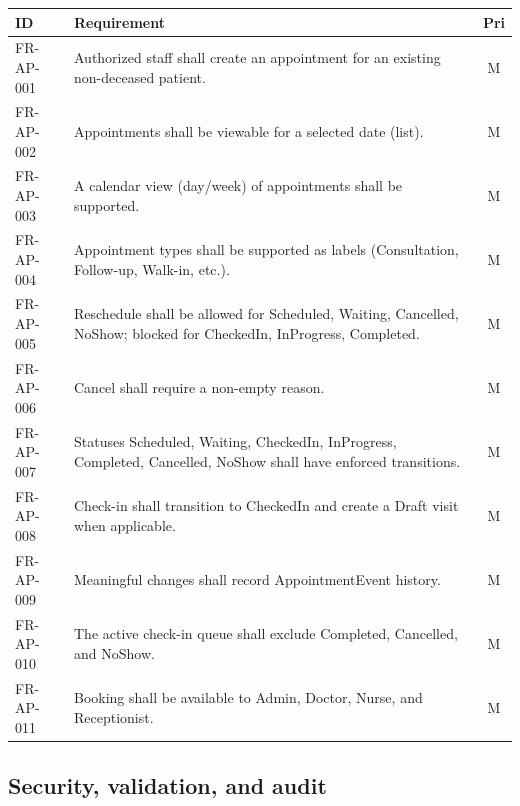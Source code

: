 \documentclass[11pt,a4paper]{article}
\begin{document}
\begin{longtable}{@{}p{2.2cm}p{11.2cm}c@{}}
\toprule
\textbf{ID} & \textbf{Requirement} & \textbf{Pri} \\
\midrule
\endhead
FR-AP-001 & Authorized staff shall create an appointment for an existing non-deceased patient. & M \\
FR-AP-002 & Appointments shall be viewable for a selected date (list). & M \\
FR-AP-003 & A calendar view (day/week) of appointments shall be supported. & M \\
FR-AP-004 & Appointment types shall be supported as labels (Consultation, Follow-up, Walk-in, etc.). & M \\
FR-AP-005 & Reschedule shall be allowed for Scheduled, Waiting, Cancelled, NoShow; blocked for CheckedIn, InProgress, Completed. & M \\
FR-AP-006 & Cancel shall require a non-empty reason. & M \\
FR-AP-007 & Statuses Scheduled, Waiting, CheckedIn, InProgress, Completed, Cancelled, NoShow shall have enforced transitions. & M \\
FR-AP-008 & Check-in shall transition to CheckedIn and create a Draft visit when applicable. & M \\
FR-AP-009 & Meaningful changes shall record AppointmentEvent history. & M \\
FR-AP-010 & The active check-in queue shall exclude Completed, Cancelled, and NoShow. & M \\
FR-AP-011 & Booking shall be available to Admin, Doctor, Nurse, and Receptionist. & M \\
\bottomrule
\end{longtable}

\subsection{Security, validation, and audit}
\end{document}
